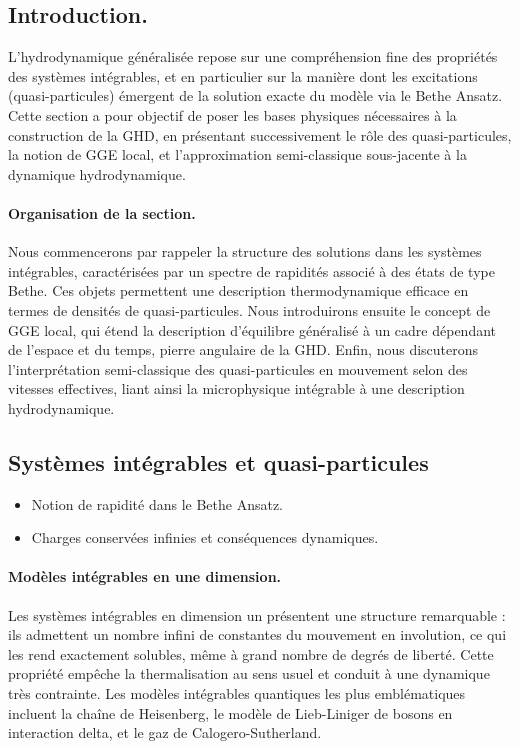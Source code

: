 \subsection*{Introduction.}
L’hydrodynamique généralisée repose sur une compréhension fine des propriétés des systèmes intégrables, et en particulier sur la manière dont les excitations (quasi-particules) émergent de la solution exacte du modèle via le Bethe Ansatz. Cette section a pour objectif de poser les bases physiques nécessaires à la construction de la GHD, en présentant successivement le rôle des quasi-particules, la notion de GGE local, et l’approximation semi-classique sous-jacente à la dynamique hydrodynamique.

\paragraph{Organisation de la section.}
Nous commencerons par rappeler la structure des solutions dans les systèmes intégrables, caractérisées par un spectre de rapidités associé à des états de type Bethe. Ces objets permettent une description thermodynamique efficace en termes de densités de quasi-particules. Nous introduirons ensuite le concept de GGE local, qui étend la description d’équilibre généralisé à un cadre dépendant de l’espace et du temps, pierre angulaire de la GHD. Enfin, nous discuterons l’interprétation semi-classique des quasi-particules en mouvement selon des vitesses effectives, liant ainsi la microphysique intégrable à une description hydrodynamique.


\subsection{Systèmes intégrables et quasi-particules}

{\color{blue}
\begin{itemize}
    \item Notion de rapidité dans le Bethe Ansatz.
    \item Charges conservées infinies et conséquences dynamiques.
\end{itemize}
}

\paragraph{Modèles intégrables en une dimension.}
Les systèmes intégrables en dimension un présentent une structure remarquable : ils admettent un nombre infini de constantes du mouvement en involution, ce qui les rend exactement solubles, même à grand nombre de degrés de liberté. Cette propriété empêche la thermalisation au sens usuel et conduit à une dynamique très contrainte. Les modèles intégrables quantiques les plus emblématiques incluent la chaîne de Heisenberg, le modèle de Lieb-Liniger de bosons en interaction delta, et le gaz de Calogero-Sutherland.

